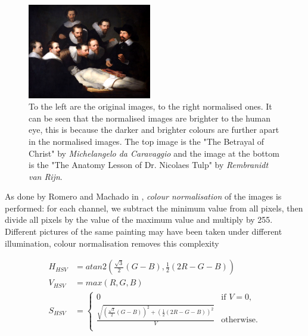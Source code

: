 \documentclass[11pt,a4paper,draft]{report}
\begin{document}
\begin{multicols}{2}
\begin{figure}[tbp]
\includegraphics[width=0.48\textwidth]{rembrandt_eu_464}
\caption[Colour normalisation]{To the left are the original images, to the
right normalised ones.  It can be seen that the normalised images are brighter
to the human eye, this is because the darker and brighter colours are further
apart in the normalised images.  The top image is the "The Betrayal of Christ"
by \emph{Michelangelo da Caravaggio} and the image at the bottom is the "The
Anatomy Lesson of Dr. Nicolaes Tulp" by \emph{Rembranidt van Rijn}.}
\label{fig:norm}
\end{figure}

As done by Romero and Machado in  \cite{jma12clas}, \emph{colour normalisation}
of the images is performed: for each channel, we subtract the minimum value
from all pixels, then divide all pixels by the value of the maximum value and
multiply by 255.  Different pictures of the same painting may have been taken
under different illumination, colour normalisation removes this complexity

\begin{figure}[!htb]
\begin{equation}
\begin{aligned}
H_{HSV}  &= atan2\left(\frac{\sqrt{3}}{2}(G-B), \frac{1}{2}(2R-G-B)\right) \\
V_{HSV}  &= max(R,G,B) \\
S_{HSV}  &= \left\{
  \begin{array}{ll}
    0  &  \text{if } V = 0, \\
    \frac{\sqrt{ \left(\frac{\sqrt{3}}{2}(G-B)\right)^2
               + \left(\frac{1}{2}(2R-G-B)\right)^2 }}{V}
  &  \text{otherwise}. \\
  \end{array}
            \right.
\label{eq:hsv}
\end{aligned}
\end{equation}
\end{figure}


\end{multicols}
\end{document}
